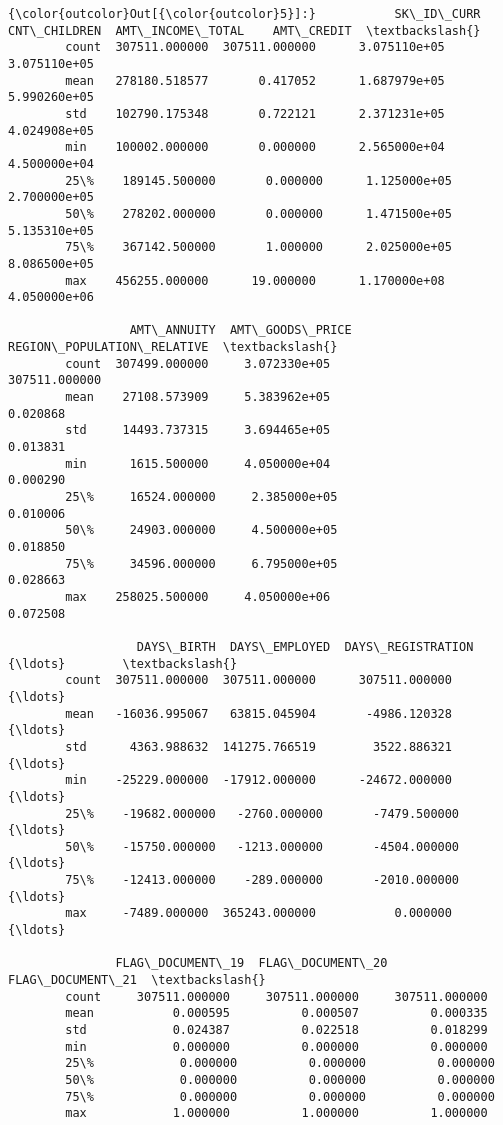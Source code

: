 \documentclass[11pt]{article}
\begin{document}
\begin{Verbatim}[commandchars=\\\{\}]
{\color{outcolor}Out[{\color{outcolor}5}]:}           SK\_ID\_CURR   CNT\_CHILDREN  AMT\_INCOME\_TOTAL    AMT\_CREDIT  \textbackslash{}
        count  307511.000000  307511.000000      3.075110e+05  3.075110e+05   
        mean   278180.518577       0.417052      1.687979e+05  5.990260e+05   
        std    102790.175348       0.722121      2.371231e+05  4.024908e+05   
        min    100002.000000       0.000000      2.565000e+04  4.500000e+04   
        25\%    189145.500000       0.000000      1.125000e+05  2.700000e+05   
        50\%    278202.000000       0.000000      1.471500e+05  5.135310e+05   
        75\%    367142.500000       1.000000      2.025000e+05  8.086500e+05   
        max    456255.000000      19.000000      1.170000e+08  4.050000e+06   
        
                 AMT\_ANNUITY  AMT\_GOODS\_PRICE  REGION\_POPULATION\_RELATIVE  \textbackslash{}
        count  307499.000000     3.072330e+05               307511.000000   
        mean    27108.573909     5.383962e+05                    0.020868   
        std     14493.737315     3.694465e+05                    0.013831   
        min      1615.500000     4.050000e+04                    0.000290   
        25\%     16524.000000     2.385000e+05                    0.010006   
        50\%     24903.000000     4.500000e+05                    0.018850   
        75\%     34596.000000     6.795000e+05                    0.028663   
        max    258025.500000     4.050000e+06                    0.072508   
        
                  DAYS\_BIRTH  DAYS\_EMPLOYED  DAYS\_REGISTRATION      {\ldots}        \textbackslash{}
        count  307511.000000  307511.000000      307511.000000      {\ldots}         
        mean   -16036.995067   63815.045904       -4986.120328      {\ldots}         
        std      4363.988632  141275.766519        3522.886321      {\ldots}         
        min    -25229.000000  -17912.000000      -24672.000000      {\ldots}         
        25\%    -19682.000000   -2760.000000       -7479.500000      {\ldots}         
        50\%    -15750.000000   -1213.000000       -4504.000000      {\ldots}         
        75\%    -12413.000000    -289.000000       -2010.000000      {\ldots}         
        max     -7489.000000  365243.000000           0.000000      {\ldots}         
        
               FLAG\_DOCUMENT\_19  FLAG\_DOCUMENT\_20  FLAG\_DOCUMENT\_21  \textbackslash{}
        count     307511.000000     307511.000000     307511.000000   
        mean           0.000595          0.000507          0.000335   
        std            0.024387          0.022518          0.018299   
        min            0.000000          0.000000          0.000000   
        25\%            0.000000          0.000000          0.000000   
        50\%            0.000000          0.000000          0.000000   
        75\%            0.000000          0.000000          0.000000   
        max            1.000000          1.000000          1.000000   
        

\end{Verbatim}
\end{document}
